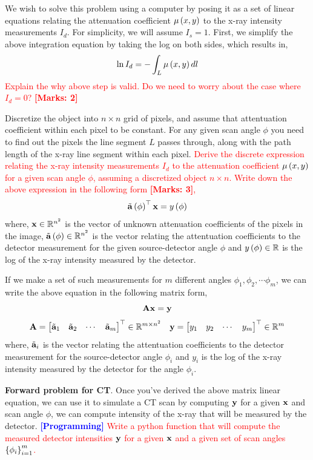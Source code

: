 \documentclass[12pt]{article}
\def\mf{\ensuremath\mathbf}
\def\mb{\ensuremath\mathbb}
\def\lp{\ensuremath\left(}
\def\rp{\ensuremath\right)}
\def\lc{\ensuremath\left\{}
\def\rc{\ensuremath\right\}}
\def\emx{\ensuremath\end{bmatrix*}}
\def\bmxc{\ensuremath\begin{bmatrix*}[c]}
\newcommand{\ct}[1]{\lp #1\rp}
\begin{document}
\begin{enumerate}
We wish to solve this problem using a computer by posing it as a set of linear equations relating the attenuation coefficient $\mu\ct{x,y}$ to the x-ray intensity measurements $I_d$. For simplicity, we will assume $I_s = 1$. First, we simplify the above integration equation by taking the log on both sides, which results in,
\[ \ln I_d = - \int_L \mu \ct{x, y} dl \]
\textcolor{red}{Explain the why above step is valid. Do we need to worry about the case where $I_d = 0$? \textbf{[Marks: 2]}}

Discretize the object into $n \times n$ grid of pixels, and assume that attentuation coefficient within each pixel to be constant. For any given scan angle $\phi$ you need to find out the pixels the line segment $L$ passes through, along with the path length of the x-ray line segment within each pixel. \textcolor{red}{Derive the discrete expression relating the x-ray intensity measurements $I_d$ to the attenuation coefficient $\mu\ct{x,y}$ for a given scan angle $\phi$, assuming a discretized object $n \times n$. Write down the above expression in the following form \textbf{[Marks: 3]},
\[ \tilde{\mf{a}}\ct{\phi}^\top \mf{x} = y\ct{\phi} \]}
where, $\mf{x} \in \mb{R}^{n^2}$ is the vector of unknown attenuation coefficients of the pixels in the image, $\tilde{\mf{a}}\ct{\phi} \in \mb{R}^{n^2}$ is the vector relating the attentuation coefficients to the detector measurement for the given source-detector angle $\phi$ and $y\ct{\phi} \in \mb{R}$ is the log of the x-ray intensity measured by the detector. 

If we make a set of such measurements for $m$ different angles $\phi_1, \phi_2, \cdots \phi_m$, we can write the above equation in the following matrix form,
\[ \mf{A}\mf{x} = \mf{y} \]
\[ \mf{A} = \bmxc \tilde{\mf{a}}_1 & \tilde{\mf{a}}_2 & \cdots & \tilde{\mf{a}}_m\emx^\top \in \mb{R}^{m \times n^2}\quad \mf{y} = \bmxc y_1 & y_2 & \cdots & y_m\emx^\top \in \mb{R}^{m} \]
where, $\tilde{\mf{a}}_i$ is the vector relating the attentuation coefficients to the detector measurement for the source-detector angle $\phi_i$ and $y_i$ is the log of the x-ray intensity measured by the detector for the angle $\phi_i$.

\textbf{Forward problem for CT}. Once you've derived the above matrix linear equation, we can use it to simulate a CT scan by computing $\mf{y}$ for a given $\mf{x}$ and scan angle $\phi$, we can compute intensity of the x-ray that will be measured by the detector. \textcolor{red}{\textcolor{blue}{\textbf{[Programming]}} Write a python function that will compute the measured detector intensities $\mf{y}$ for a given $\mf{x}$ and a given set of scan angles $\lc \phi_i \rc_{i=1}^{m}$.} 


\end{enumerate}
\end{document}
